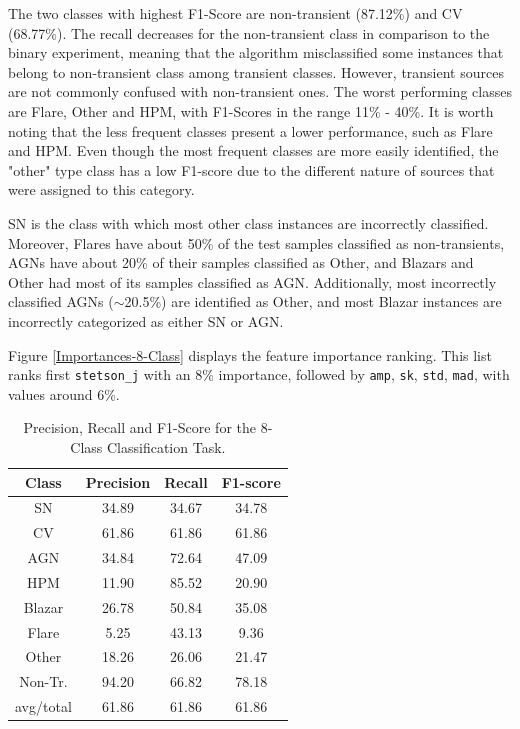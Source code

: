 \documentclass{aastex62}
\begin{document}
The two classes with highest F1-Score are non-transient (87.12\%) and CV (68.77\%). 
The recall decreases for the non-transient class in comparison to the binary experiment, 
meaning that the algorithm misclassified some instances that belong to non-transient class
among transient classes. 
However, transient sources are not commonly confused with non-transient ones. 
The worst performing classes are Flare, Other and HPM, with F1-Scores in the 
range 11\% - 40\%. 
It is worth noting that the less frequent classes present a lower performance, 
such as Flare and HPM. 
Even though the most frequent classes are more easily identified, 
the "other" type class has a low F1-score due to the different nature 
of sources that were assigned to this category. 


SN is the class with which most other class instances are
incorrectly classified. 
Moreover, Flares have about 50\% of the test samples classified as
non-transients, AGNs have about 20\% of their 
samples classified as Other, and Blazars and Other had most of  its
samples classified as AGN. 
Additionally, most incorrectly classified AGNs ($\sim$20.5\%) are
identified as Other, and most Blazar instances are
incorrectly categorized as either SN or AGN. 


Figure \ref{Importances-8-Class} displays the feature importance ranking.
This list ranks first \texttt{stetson\_j} with an 8\% importance,
followed by \texttt{amp}, \texttt{sk}, \texttt{std}, \texttt{mad},
with values around 6\%.   

\begin{table}
\centering
\begin{tabular}{cccc}
\hline
\textbf{Class} & \textbf{Precision} & \textbf{Recall} & \textbf{F1-score} \\\hline \hline
SN             & 34.89              & 34.67           & 34.78             \\\hline
CV             & 61.86              & 61.86           & 61.86             \\\hline
AGN            & 34.84              & 72.64           & 47.09             \\\hline
HPM            & 11.90              & 85.52           & 20.90             \\\hline
Blazar         & 26.78              & 50.84           & 35.08             \\\hline
Flare          & 5.25               & 43.13           & 9.36              \\\hline
Other          & 18.26              & 26.06           & 21.47             \\\hline
Non-Tr.        & 94.20              & 66.82           & 78.18             \\\hline
avg/total      & 61.86              & 61.86           & 61.86             \\\hline
\end{tabular}%
\caption{Precision, Recall and F1-Score for the 8-Class Classification Task.}
\label{Overall-Scores-8-Class-Regular}
\end{table}
\end{document}
